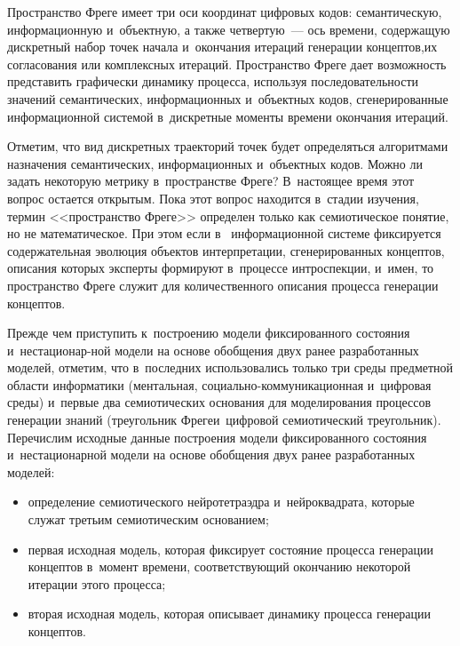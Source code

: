 {\begin{multicols}{2}
      Пространство Фреге имеет три оси координат цифровых кодов: семантическую, 
информационную и~объектную, а также четвертую~--- ось времени, содержащую 
дискретный набор точек начала и~окончания итераций генерации концептов,\linebreak их 
согласования или комплексных итераций. Пространст\-во Фреге дает возможность 
представить графически динамику процесса, используя последовательности значений 
семантических, информационных и~объектных кодов, сгенерированные информационной 
системой в~дискретные моменты времени окончания итераций.
      
      Отметим, что вид дискретных траекторий точек будет определяться алгоритмами 
назначения семантических, информационных и~объектных кодов. Можно ли задать 
некоторую метрику в~пространстве Фреге? В~настоящее время этот вопрос остается 
открытым. Пока этот вопрос находится в~стадии изучения, термин <<пространство Фреге>> 
определен только как семиотическое понятие, но не математическое. При этом если в~
информационной системе фиксируется содержательная эволюция объектов интерпретации, 
сгенерированных концептов, описания которых эксперты формируют в~процессе 
интроспекции, и~имен, то пространство Фреге служит для количественного описания 
процесса генерации концептов.
      
      Прежде чем приступить к~построению модели фиксированного состояния 
      и~нестационар-\linebreak ной модели на основе обобщения двух ранее 
      раз\-работанных моделей, отметим, 
что в~последних использова\-лись только три среды предметной об\-ласти информати\-ки 
(ментальная, со\-ци\-аль\-но-ком\-му\-ни\-ка\-ци\-он\-ная и~цифровая среды) и~первые два 
семиотических основания для моделирования процессов генерации знаний (треугольник 
Фреге\linebreak и~цифровой семиотический треугольник). Пере\-чис\-лим исходные данные построения 
модели фиксированного состояния и~нестационарной модели на основе обобщения двух 
ранее разработанных моделей:
      \begin{itemize}
\item определение семиотического нейротетраэдра и~нейроквадрата, которые 
служат третьим семиотическим основанием;
\item первая исходная модель, которая фиксирует состояние процесса генерации 
концептов в~момент времени, соответствующий окончанию некоторой итерации 
этого процесса;
\item вторая исходная модель, которая описывает динамику процесса генерации 
концептов.
\end{itemize}


\end{multicols}}
